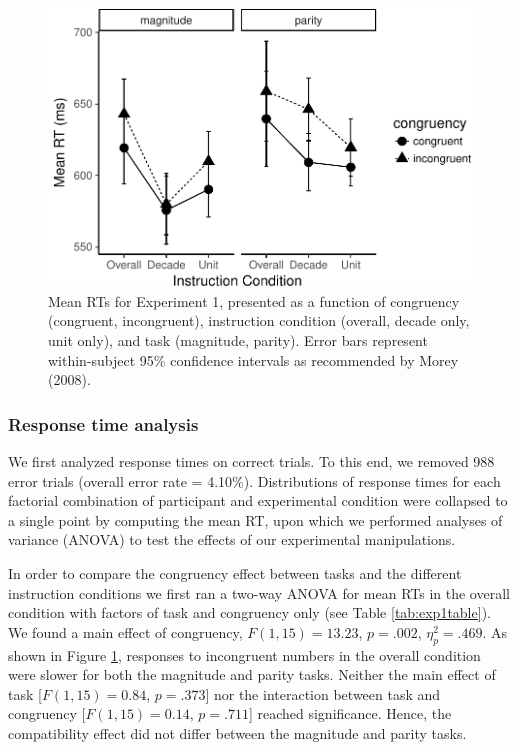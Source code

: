 \documentclass[english,man]{apa6}
\theoremstyle{definition}
\theoremstyle{definition}
\theoremstyle{definition}
\theoremstyle{remark}
\begin{document}
\begin{figure}
\centering
\includegraphics{paper_files/figure-latex/exp1-1.pdf}
\caption{\label{fig:exp1}Mean RTs for Experiment 1, presented as a function
of congruency (congruent, incongruent), instruction condition (overall,
decade only, unit only), and task (magnitude, parity). Error bars
represent within-subject 95\% confidence intervals as recommended by
Morey (2008).}
\end{figure}

\subsubsection{Response time analysis}\label{response-time-analysis}

We first analyzed response times on correct trials. To this end, we
removed 988 error trials (overall error rate = 4.10\%). Distributions of
response times for each factorial combination of participant and
experimental condition were collapsed to a single point by computing the
mean RT, upon which we performed analyses of variance (ANOVA) to test
the effects of our experimental manipulations.

In order to compare the congruency effect between tasks and the
different instruction conditions we first ran a two-way ANOVA for mean
RTs in the overall condition with factors of task and congruency only
(see Table \ref{tab:exp1table}). We found a main effect of congruency,
\(F(1, 15) = 13.23\), \(p = .002\), \(\eta^2_p = .469\). As shown in
Figure \ref{fig:exp1}, responses to incongruent numbers in the overall
condition were slower for both the magnitude and parity tasks. Neither
the main effect of task {[}\(F(1, 15) = 0.84\), \(p = .373\){]} nor the
interaction between task and congruency {[}\(F(1, 15) = 0.14\),
\(p = .711\){]} reached significance. Hence, the compatibility effect
did not differ between the magnitude and parity tasks.
\end{document}
